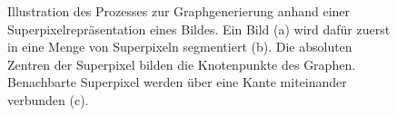 \begin{figure}[t]
\centering
{}
\caption[Graphgenerierung aus einer Superpixelrepräsentation]{Illustration des Prozesses zur Graphgenerierung anhand einer Superpixelrepräsentation eines Bildes.
Ein Bild (a) wird dafür zuerst in eine Menge von Superpixeln segmentiert (b).
Die absoluten Zentren der Superpixel bilden die Knotenpunkte des Graphen.
Benachbarte Superpixel werden über eine Kante miteinander verbunden (c).}
\label{fig:superpixel_graph}
\end{figure}
